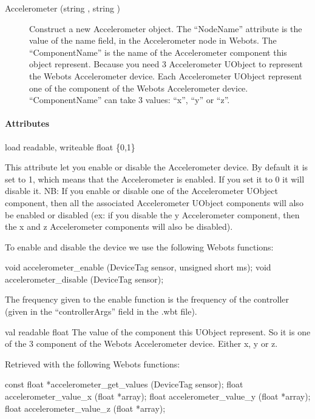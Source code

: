 \noindent
\begin{description}
\item[{Accelerometer (string , string
    )}] Construct a new Accelerometer object.  The
  ``NodeName'' attribute is the value of the name field, in the
  Accelerometer node in Webots.  The ``ComponentName'' is the name of
  the Accelerometer component this object represent.  Because you need
  3 Accelerometer UObject to represent the Webots Accelerometer
  device. Each Accelerometer UObject represent one of the component of
  the Webots Accelerometer device.  ``ComponentName'' can take 3
  values: ``x'', ``y'' or ``z''.
\end{description}

\paragraph{Attributes}

\noindent
\begin{itemize}
\begin{attribute}{load}
  {readable, writeable}
  {float}
  {\{0,1\}}

  This attribute let you enable or disable the Accelerometer device.
  By default it is set to 1, which means that the Accelerometer is
  enabled. If you set it to 0 it will disable it. NB: If you enable or
  disable one of the Accelerometer UObject component, then all the
  associated Accelerometer UObject components will also be enabled or
  disabled (ex: if you disable the y Accelerometer component, then the
  x and z Accelerometer components will also be disabled).

  To enable and disable the device we use the following Webots
  functions:

\begin{cxx}
void accelerometer_enable (DeviceTag sensor, unsigned short ms);
void accelerometer_disable (DeviceTag sensor);
\end{cxx}

    The frequency given to the enable function is the frequency of the
    \urbi controller (given in the ``controllerArgs'' field in the .wbt
    file).
\end{attribute}

\begin{attribute}{val}
  {readable}
  {float}
  {}
  The value of the component this UObject represent. So
  it is one of the 3 component of the Webots Accelerometer
  device. Either x, y or z.


  Retrieved with the following Webots functions:


\begin{cxx}
const float *accelerometer_get_values (DeviceTag sensor);
float accelerometer_value_x (float *array);
float accelerometer_value_y (float *array);
float accelerometer_value_z (float *array);
\end{cxx}
\end{attribute}

\end{itemize}

